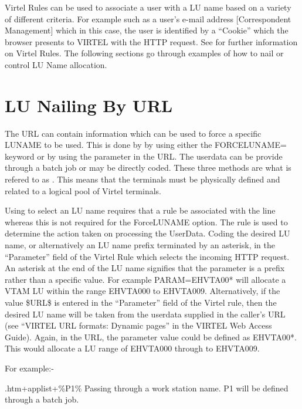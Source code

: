 \documentclass[letterpaper,10pt,english]{sphinxmanual}
\begin{document}
Virtel Rules can be used to associate a user with a LU name based on a variety of different criteria. For example such as a user’s e-mail address {[}Correspondent Management{]} which in this case, the user is identified by a “Cookie” which the browser presents to VIRTEL with the HTTP request. See {\hyperref[\detokenize{connectivity_guide:v461cn-virtelrules}]{}} for further information on Virtel Rules. The following sections go through examples of how to nail or control LU Name allocation.


\section{LU Nailing By URL}
\label{\detokenize{connectivity_guide:lu-nailing-by-url}}
The URL can contain information which can be used to force a specific LUNAME to be used. This is done by by using either the FORCELUNAME= keyword or by using the  parameter in the URL. The userdata can be provide through a batch job or may be directly coded. These three methods are what is refered to as . This means that the terminals must be physically defined and related to a logical pool of Virtel terminals.

Using  to select an LU name requires that a rule be associated with the line whereas this is not required for the ForceLUNAME option. The rule is used to determine the action taken on processing the UserData. Coding the desired LU name, or alternatively an LU name prefix terminated by an asterisk, in the “Parameter” field of the Virtel Rule which selects the incoming HTTP request. An asterisk at the end of the LU name signifies that the parameter is a prefix rather than a specific value. For example PARAM=EHVTA00* will allocate a VTAM LU within the range EHVTA000 to EHVTA009. Alternatively, if the value \$URL\$ is entered in the “Parameter” field of the Virtel rule, then the desired LU name will be taken from the userdata supplied in the caller’s URL (see “VIRTEL URL formats: Dynamic pages” in the VIRTEL Web Access Guide). Again, in the URL, the parameter value could be defined as EHVTA00*. This would allocate a LU range of EHVTA000 through to EHVTA009.

For example:-

.htm+applist+\%P1\%                Passing through a work station name. P1 will be defined through a batch job.
\end{document}
